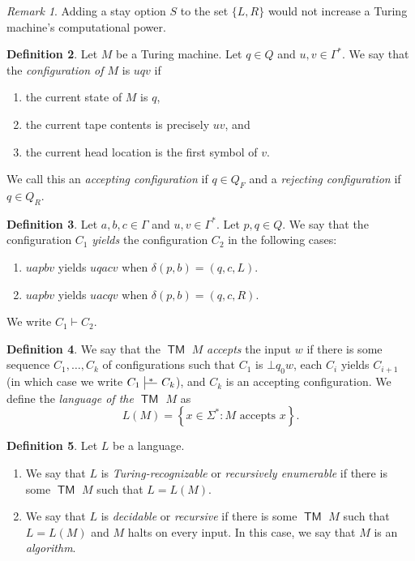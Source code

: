 \documentclass[10pt,letterpaper,cm]{nupset}
\theoremstyle{definition}
\newtheorem{definition}{Definition}[subsection]
\theoremstyle{theorem}
\theoremstyle{remark}
\newtheorem{remark}[definition]{Remark}
\def\ruleoffset{1pt}
\newcommand\specialvdash[2]{\mathrel{\ensurestackMath{
  \mkern2mu\rule[-\dp\strutbox]{.4pt}{\baselineskip}\stackon[\ruleoffset]{
    \stackunder[\dimexpr\ruleoffset-.4\ht\strutbox+.4\dp\strutbox]{
      \rule[\dimexpr.4\ht\strutbox-.4\dp\strutbox]{2.5ex}{.4pt}}{
        \scriptstyle #1}}{\scriptstyle#2}\mkern2mu}}
}
\newcommand{\1}{\mathbf{1}}
\newcommand{\0}{\vec 0}
\DeclareMathOperator{\TM}{\mathsf{TM}}
\begin{document}
\begin{remark}
Adding a stay option $S$ to the set $\{L, R\}$ would not increase a Turing machine's computational power.
\end{remark}

\begin{definition}
Let $M$ be a Turing machine. Let $q\in Q$ and $u,v\in \Gamma^{\ast}$. We say that the \textit{configuration of $M$} is $uqv$ if 
\begin{enumerate}[label=(\alph*)]
\item the current state of $M$ is $q$,
\item the current tape contents is precisely $uv$, and
\item the current head location is the first symbol of $v$.
\end{enumerate}
We call this an \textit{accepting configuration} if $q \in Q_F$ and a \textit{rejecting configuration} if $q \in Q_R$.
\end{definition}

\begin{definition}
Let $a,b,c\in \Gamma$ and $u,v\in \Gamma^{\ast}$. Let $p,q\in Q$. We say that the configuration $C_1$ \textit{yields} the configuration $C_2$ in the following cases:
\begin{enumerate}[label=(\alph*)]
\item $uapbv$ yields $uqacv$ when $\delta(p,b) = (q, c, L)$.
\item $uapbv$ yields $uacqv$ when $\delta(p, b) = (q, c, R)$. 
\end{enumerate}
We write $C_1 \vdash C_2$.
\end{definition}

\begin{definition}
We say that the $\TM$ $M$ \textit{accepts} the input $w$ if there is some sequence $C_1, \ldots, C_k$ of configurations such that $C_1$ is $\bot q_0w$, each $C_i$ yields $C_{i+1}$ (in which case we write $C_1 \specialvdash{}{*} C_k $), and $C_k$ is an accepting configuration.  We define the \textit{language of the $\TM$ $M$} as $$L(M) = \left\{x \in \Sigma^{\ast}: M \text{ accepts } x \right\}.$$
\end{definition}

\begin{definition} Let $L$ be a language.
\begin{enumerate}
\item We say that $L$ is \textit{Turing-recognizable} or \textit{recursively enumerable} if there is some $\TM$ $M$ such that $L = L(M)$.
\item We say that $L$ is \textit{decidable} or \textit{recursive} if there is some $\TM$ $M$ such that $L= L(M)$ and $M$ halts on every input. In this case, we say that $M$ is an \textit{algorithm}.
\end{enumerate}
\end{definition}
\end{document}
